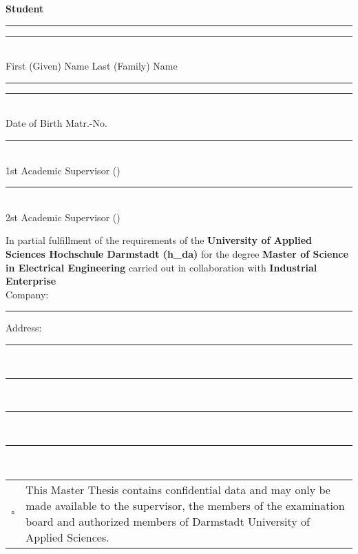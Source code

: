 \textbf{\Large Student}
\par \vspace{10mm}
\rule[0ex]{0.45\textwidth}{0.4pt} \hspace{14mm}
\rule[0ex]{0.45\textwidth}{0.4pt}\\
First (Given) Name \hspace{55mm}
Last (Family) Name
\par \vspace{10mm}
\rule[0ex]{0.45\textwidth}{0.4pt} \hspace{14mm}
\rule[0ex]{0.45\textwidth}{0.4pt}\\
Date of Birth \hspace{66mm}
Matr.-No.


\par \vspace{10mm}
\rule[0ex]{\textwidth}{0.4pt} \\
1st Academic Supervisor (\textit{\supervisor})
\par \vspace{10mm}
\rule[0ex]{\textwidth}{0.4pt} \\
2st Academic Supervisor (\textit{\supervisorsec})


\par \vspace{15mm} 
In partial fulfillment of the requirements of the \textbf{University of Applied Sciences Hochschule Darmstadt (h\_da)} for the degree \textbf{Master of Science in Electrical Engineering} carried out in collaboration with \textbf{Industrial Enterprise}\\[1ex]

Company: \rule[0ex]{0.885\textwidth}{0.4pt} 

Address: \rule[0ex]{0.9\textwidth}{0.4pt}\\[2ex]
\rule[0ex]{\textwidth}{0.4pt} \\[2ex]
\rule[0ex]{\textwidth}{0.4pt} \\[2ex]
\rule[0ex]{\textwidth}{0.4pt} \\[0ex]
\vspace{1cm}
\begin{table}[h]
	\begin{tabular}{lp{14.7cm}}
		$\square$ & This Master Thesis contains confidential data and may only be made available to the 
	supervisor, the members of the examination board and authorized members of Darmstadt 
	University of Applied Sciences.
	\end{tabular}
\end{table}



